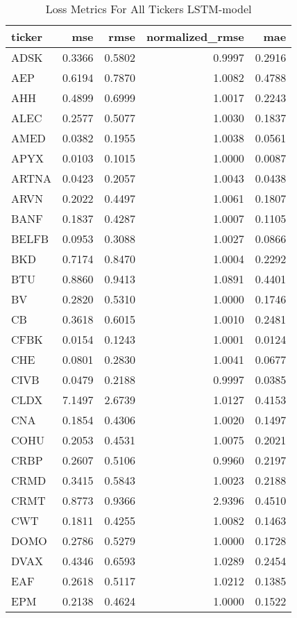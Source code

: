 \begin{table}
\caption{Loss Metrics For All Tickers LSTM-model}
\label{tab:loss_total_lstm}
\begin{tabular}{lrrrr}
\toprule
ticker & mse & rmse & normalized_rmse & mae \\
\midrule
ADSK & 0.3366 & 0.5802 & 0.9997 & 0.2916 \\
AEP & 0.6194 & 0.7870 & 1.0082 & 0.4788 \\
AHH & 0.4899 & 0.6999 & 1.0017 & 0.2243 \\
ALEC & 0.2577 & 0.5077 & 1.0030 & 0.1837 \\
AMED & 0.0382 & 0.1955 & 1.0038 & 0.0561 \\
APYX & 0.0103 & 0.1015 & 1.0000 & 0.0087 \\
ARTNA & 0.0423 & 0.2057 & 1.0043 & 0.0438 \\
ARVN & 0.2022 & 0.4497 & 1.0061 & 0.1807 \\
BANF & 0.1837 & 0.4287 & 1.0007 & 0.1105 \\
BELFB & 0.0953 & 0.3088 & 1.0027 & 0.0866 \\
BKD & 0.7174 & 0.8470 & 1.0004 & 0.2292 \\
BTU & 0.8860 & 0.9413 & 1.0891 & 0.4401 \\
BV & 0.2820 & 0.5310 & 1.0000 & 0.1746 \\
CB & 0.3618 & 0.6015 & 1.0010 & 0.2481 \\
CFBK & 0.0154 & 0.1243 & 1.0001 & 0.0124 \\
CHE & 0.0801 & 0.2830 & 1.0041 & 0.0677 \\
CIVB & 0.0479 & 0.2188 & 0.9997 & 0.0385 \\
CLDX & 7.1497 & 2.6739 & 1.0127 & 0.4153 \\
CNA & 0.1854 & 0.4306 & 1.0020 & 0.1497 \\
COHU & 0.2053 & 0.4531 & 1.0075 & 0.2021 \\
CRBP & 0.2607 & 0.5106 & 0.9960 & 0.2197 \\
CRMD & 0.3415 & 0.5843 & 1.0023 & 0.2188 \\
CRMT & 0.8773 & 0.9366 & 2.9396 & 0.4510 \\
CWT & 0.1811 & 0.4255 & 1.0082 & 0.1463 \\
DOMO & 0.2786 & 0.5279 & 1.0000 & 0.1728 \\
DVAX & 0.4346 & 0.6593 & 1.0289 & 0.2454 \\
EAF & 0.2618 & 0.5117 & 1.0212 & 0.1385 \\
EPM & 0.2138 & 0.4624 & 1.0000 & 0.1522 \\

\end{tabular}
\end{table}
